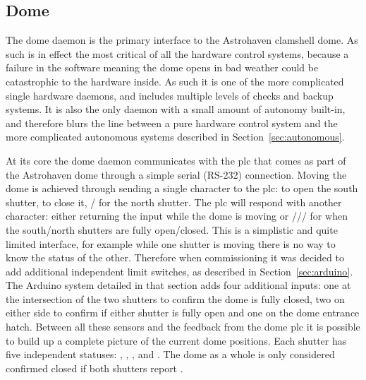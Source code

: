 \begin{colsection}
\begin{colsection}
\end{colsection}


\subsection{Dome}
\label{sec:dome}
\begin{colsection}

The dome daemon is the primary interface to the Astrohaven clamshell dome. As such is in effect the most critical of all the hardware control systems, because a failure in the software meaning the dome opens in bad weather could be catastrophic to the hardware inside. As such it is one of the more complicated single hardware daemons, and includes multiple levels of checks and backup systems. It is also the only daemon with a small amount of autonomy built-in, and therefore blurs the line between a pure hardware control system and the more complicated autonomous systems described in Section~\ref{sec:autonomous}.

At its core the dome daemon communicates with the \gls{plc} that comes as part of the Astrohaven dome through a simple serial (RS-232) connection. Moving the dome is achieved through sending a single character to the \gls{plc}:  to open the south shutter,  to close it, / for the north shutter. The \gls{plc} will respond with another character: either returning the input while the dome is moving or /// for when the south/north shutters are fully open/closed. This is a simplistic and quite limited interface, for example while one shutter is moving there is no way to know the status of the other. Therefore when commissioning it was decided to add additional independent limit switches, as described in Section~\ref{sec:arduino}. The Arduino system detailed in that section adds four additional inputs: one at the intersection of the two shutters to confirm the dome is fully closed, two on either side to confirm if either shutter is fully open and one on the dome entrance hatch. Between all these sensors and the feedback from the dome \gls{plc} it is possible to build up a complete picture of the current dome positions. Each shutter has five independent statuses: , , ,  and . The dome as a whole is only considered confirmed closed if both shutters report .


\end{colsection}
\end{colsection}
